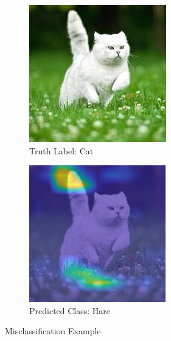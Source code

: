 \begin{figure}
     \centering
     \begin{subfigure}[b]{0.39\textwidth}
         \centering
         \includegraphics[width=\textwidth]{images/cat-hare-1.jpeg}
         \caption{Truth Label: Cat}
         \label{fig:cat}
     \end{subfigure}
     \hfill
     \begin{subfigure}[b]{0.39\textwidth}
         \centering
         \includegraphics[width=\textwidth]{images/cat-hm-1.png}
         \caption{Predicted Class: Hare}
         \label{fig:hare}
     \end{subfigure}
        \caption{Misclassification Example}
        \label{fig:incorrect-prediction}
\end{figure}

